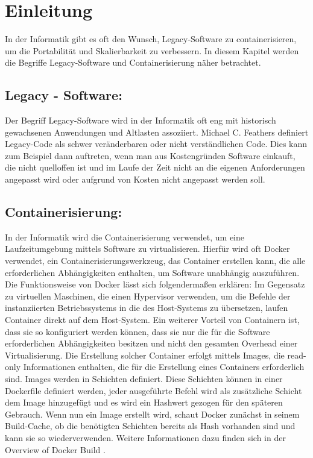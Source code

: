 

\section{Einleitung}

In der Informatik gibt es oft den Wunsch, Legacy-Software zu containerisieren, um die Portabilität und Skalierbarkeit zu verbessern.
In diesem Kapitel werden die Begriffe Legacy-Software und Containerisierung näher betrachtet.
\subsection{Legacy - Software:}
Der Begriff Legacy-Software wird in der Informatik oft eng mit historisch gewachsenen Anwendungen und Altlasten assoziiert.
Michael C. Feathers definiert Legacy-Code als schwer veränderbaren oder nicht verständlichen Code.
Dies kann zum Beispiel dann auftreten, wenn man aus Kostengründen Software einkauft, die nicht quelloffen ist und im Laufe der Zeit nicht an die eigenen Anforderungen angepasst wird oder aufgrund von Kosten nicht angepasst werden soll.
\subsection{Containerisierung:}
In der Informatik wird die Containerisierung verwendet, um eine Laufzeitumgebung mittels Software zu virtualisieren.
Hierfür wird oft Docker verwendet, ein Containerisierungswerkzeug, das Container erstellen kann, die alle erforderlichen Abhängigkeiten enthalten, um Software unabhängig auszuführen.
Die Funktionsweise von Docker lässt sich folgendermaßen erklären: Im Gegensatz zu virtuellen Maschinen, die einen Hypervisor verwenden, um die Befehle der instanziierten Betriebssystems in die des Host-Systems zu übersetzen, laufen Container direkt auf dem Host-System.
Ein weiterer Vorteil von Containern ist, dass sie so konfiguriert werden können, dass sie nur die für die Software erforderlichen Abhängigkeiten besitzen und nicht den gesamten Overhead einer Virtualisierung.
Die Erstellung solcher Container erfolgt mittels Images, die read-only Informationen enthalten, die für die Erstellung eines Containers erforderlich sind. Images werden in Schichten definiert.
Diese Schichten können in einer Dockerfile definiert werden, jeder ausgeführte Befehl wird als zusätzliche Schicht dem Image hinzugefügt und es wird ein Hashwert gezogen für den späteren Gebrauch.
Wenn nun ein Image erstellt wird, schaut Docker zunächst in seinem Build-Cache, ob die benötigten Schichten bereits als Hash vorhanden sind und kann sie so wiederverwenden.
Weitere Informationen dazu finden sich in der Overview of Docker Build \cite{dockerbuild}.

